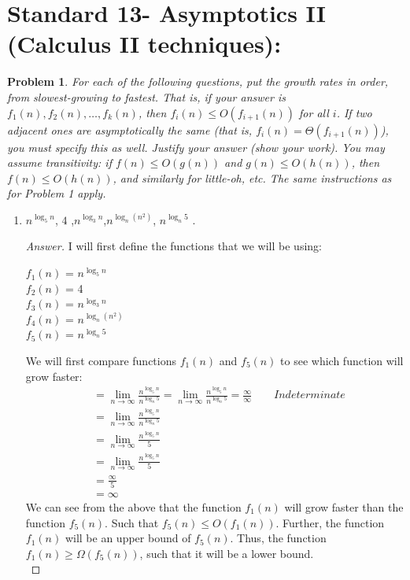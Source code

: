 \documentclass[11pt]{article}
\theoremstyle{definition}
\theoremstyle{definition}
\newtheorem{required}{Problem}
\theoremstyle{definition}
\begin{document}
\newpage
\section{Standard 13- Asymptotics II (Calculus II techniques): }
\begin{required}



    {\itshape For each of the following questions, put the growth rates in order, from slowest-growing to fastest. That is, if your answer is $f_1(n), f_2(n), \dotsc, f_k(n)$, then $f_i(n) \leq O(f_{i+1}(n))$ for all $i$. If two adjacent ones are asymptotically the same (that is, $f_i(n) = \Theta(f_{i+1}(n))$), you must specify this as well. 
    Justify your answer (show your work). You may assume transitivity: if $f(n) \leq O(g(n))$ and $g(n) \leq O(h(n))$, then $f(n) \leq O(h(n))$, and similarly for little-oh, etc. The same instructions as for Problem 1 apply.}
    \begin{enumerate}[label=(\alph*)]
\subsection{Problem 13\ref{2a}}
        \item \label{2a} $n^{\log_5 n}$, \qquad $4$ ,\qquad $n^{\log_3 n}$,\qquad  $n^{\log_n(n^2)}$, \qquad $ n^{\log_n 5}$ .
        \begin{proof}[Answer]
I will first define the functions that we will be using:
\begin{center}
$f_1(n)$ = $n^{\log_5 n}$ \\
$f_2(n)$ = 4 \\
$f_3(n)$ = $n^{\log_3 n}$ \\
$f_4(n)$ = $n^{\log_n(n^2)}$ \\
$f_5(n)$ = $ n^{\log_n 5}$ \\
\end{center}

We will first compare functions $f_1(n)$ and $f_5(n)$ to see which function will grow faster: \\
\begin{align*}
&= \lim_{n \to \infty} \frac{n^{\log_5 n}}{n^{\log_n 5}} = \lim_{n \to \infty} \frac{n^{\log_5 n}}{n^{\log_n 5}}  = \frac{\infty}{\infty} \qquad Indeterminate  \\
&= \lim_{n \to \infty} \frac{n^{\log_5 n}}{n^{\log_n 5}}\\
&= \lim_{n \to \infty} \frac{n^{\log_5 n}}{5}\\
&= \lim_{n \to \infty} \frac{n^{\log_5 n}}{5}\\
&= \frac {\infty}{5} \\
&= \infty
\end{align*} 
We can see from the above that the function $f_1(n)$ will grow faster than the function $f_5(n)$. Such that $f_5(n) \leq O(f_1(n))$. Further, the function $f_1(n)$ will be an upper bound of $f_5(n)$. Thus, the function $f_1(n) \geq \Omega(f_5(n))$, such that it will be a lower bound. \\


\end{proof}
\end{enumerate}
\end{required}
\end{document}
